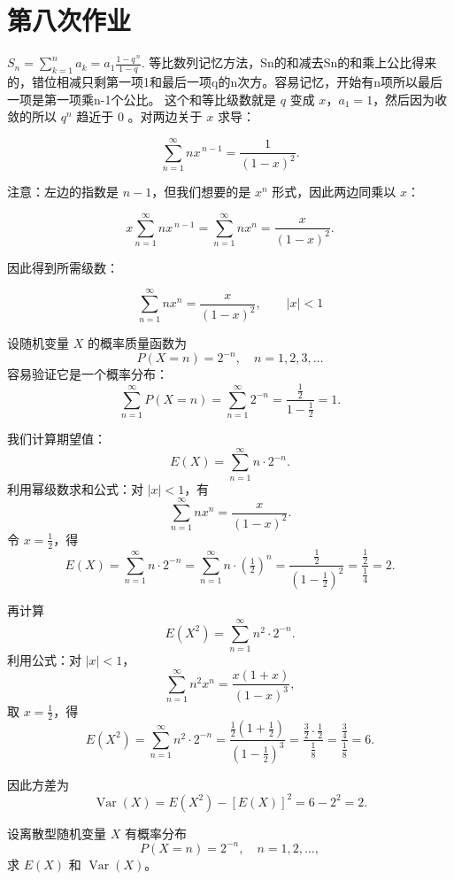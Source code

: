 \section{第八次作业}

\begin{dxtips}
    $S_n=\sum_{k=1}^{n} a_k = a_1\frac{1-q^{\,n}}{1-q}.$
等比数列记忆方法，Sn的和减去Sn的和乘上公比得来的，错位相减只剩第一项1和最后一项q的n次方。容易记忆，开始有n项所以最后一项是第一项乘n-1个公比。
这个和等比级数就是 $q$ 变成 $x$，$a_1=1$，然后因为收敛的所以 $q^n$ 趋近于 $0$ 。对两边关于 $x$ 求导：

\[
\sum_{n=1}^{\infty} n x^{\,n-1} = \frac{1}{(1-x)^2}.
\]

注意：左边的指数是 $n-1$，但我们想要的是 $x^n$ 形式，因此两边同乘以 $x$：

\[
x \sum_{n=1}^{\infty} n x^{\,n-1}
= \sum_{n=1}^{\infty} n x^n
= \frac{x}{(1-x)^2}.
\]

因此得到所需级数：

\[
\boxed{
\sum_{n=1}^{\infty} n x^n = \frac{x}{(1-x)^2},\qquad |x|<1
}
\]
\end{dxtips}
\begin{solution}
设随机变量 $X$ 的概率质量函数为
\[
P(X=n)=2^{-n},\quad n=1,2,3,\dots
\]
容易验证它是一个概率分布：
\[
\sum_{n=1}^{\infty}P(X=n)=\sum_{n=1}^\infty 2^{-n}
=\frac{\frac{1}{2}}{1-\frac{1}{2}} = 1.
\]

我们计算期望值：
\[
E(X) = \sum_{n=1}^{\infty} n \cdot 2^{-n}.
\]
利用幂级数求和公式：对 \( |x|<1 \)，有
\[
\sum_{n=1}^{\infty} n x^n = \frac{x}{(1 - x)^2}.
\]
令 \(x = \tfrac12\)，得
\[
E(X) = \sum_{n=1}^{\infty} n \cdot 2^{-n}
= \sum_{n=1}^{\infty} n \cdot \left( \tfrac{1}{2} \right)^n
= \frac{\tfrac12}{(1 - \tfrac12)^2} = \frac{\tfrac12}{\tfrac14} = 2.
\]

再计算
\[
E(X^2) = \sum_{n=1}^{\infty} n^2 \cdot 2^{-n}.
\]
利用公式：对 \( |x|<1 \)，
\[
\sum_{n=1}^{\infty} n^2 x^n = \frac{x(1 + x)}{(1 - x)^3},
\]
取 \(x = \tfrac12\)，得
\[
E(X^2) = \sum_{n=1}^{\infty} n^2 \cdot 2^{-n}
= \frac{\tfrac12(1 + \tfrac12)}{(1 - \tfrac12)^3}
= \frac{\tfrac32 \cdot \tfrac12}{\tfrac18}
= \frac{\tfrac34}{\tfrac18} = 6.
\]

因此方差为
\[
\operatorname{Var}(X) = E(X^2) - [E(X)]^2 = 6 - 2^2 = 2.
\]
\end{solution}
\begin{homework}[3.5]
设离散型随机变量 $X$ 有概率分布
\[
P(X = n) = 2^{-n}, \quad n = 1, 2, \dots,
\]
求 $E(X)$ 和 $\operatorname{Var}(X)$。
\end{homework}
